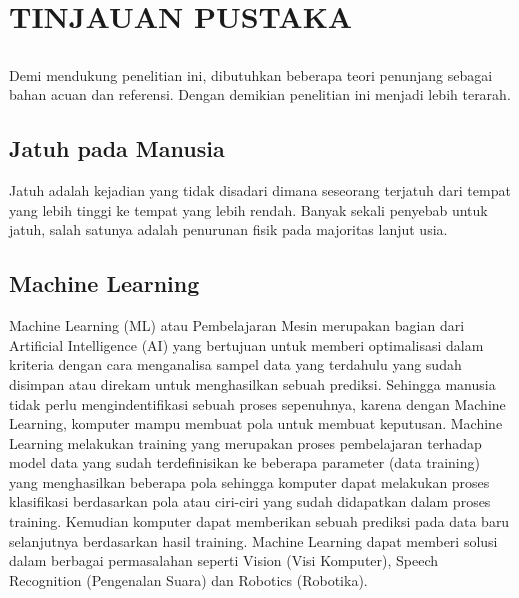 \chapter{TINJAUAN PUSTAKA}
\vspace{1ex}

\section*{}
Demi mendukung penelitian ini, dibutuhkan beberapa teori penunjang sebagai bahan acuan dan referensi. Dengan demikian penelitian ini menjadi lebih terarah. 
\vspace{1ex}

\section{Jatuh pada Manusia}
\vspace{1ex}

Jatuh adalah kejadian yang tidak disadari dimana seseorang 
terjatuh dari tempat yang lebih tinggi ke tempat yang lebih 
rendah. Banyak sekali penyebab untuk jatuh, salah satunya 
adalah penurunan fisik pada majoritas lanjut usia. 
\vspace{1ex}

\section{Machine Learning}
\vspace{1ex}

Machine Learning (ML) atau Pembelajaran Mesin merupakan bagian 
dari Artificial Intelligence (AI) yang bertujuan untuk memberi 
optimalisasi dalam kriteria dengan cara menganalisa sampel data 
yang terdahulu yang sudah disimpan atau direkam untuk menghasilkan 
sebuah prediksi. Sehingga manusia tidak perlu mengindentifikasi 
sebuah proses sepenuhnya, karena dengan Machine Learning, komputer 
mampu membuat pola untuk membuat keputusan. Machine Learning 
melakukan training yang merupakan proses pembelajaran terhadap 
model data yang sudah terdefinisikan ke beberapa parameter 
(data training) yang menghasilkan beberapa pola sehingga komputer 
dapat melakukan proses klasifikasi berdasarkan pola atau ciri-ciri 
yang sudah didapatkan dalam proses training. Kemudian komputer 
dapat memberikan sebuah prediksi pada data baru selanjutnya 
berdasarkan hasil training. Machine Learning dapat memberi solusi 
dalam berbagai permasalahan seperti Vision (Visi Komputer), Speech 
Recognition (Pengenalan Suara) dan Robotics (Robotika).
\vspace{1ex}

